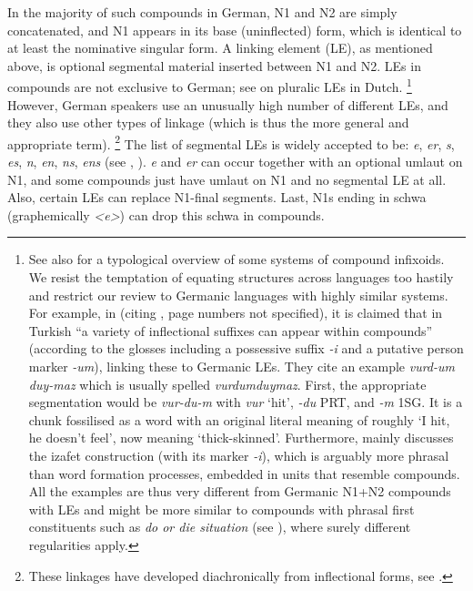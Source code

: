 In the majority of such compounds in German, N1 and N2 are simply concatenated, and N1 appears in its base (uninflected) form, which is identical to at least the nominative singular form.
A linking element (LE), as mentioned above, is optional segmental material inserted between N1 and N2.
LEs in compounds are not exclusive to German; see \textcite{SchreuderEa1998,BangaEa2013a,BangaEa2013b} on pluralic LEs in Dutch.%
\footnote{See also \textcite[27]{KrottEa2007} for a typological overview of some systems of compound infixoids.
We resist the temptation of equating structures across languages too hastily and restrict our review to Germanic languages with highly similar systems.
For example, in \textcite[4]{KirchnerNicoladis2009} (citing \citealt{Spencer1991}, page numbers not specified), it is claimed that in Turkish ``a variety of inflectional suffixes can appear within compounds'' (according to the glosses including a possessive suffix \textit{-i} and a putative person marker \mbox{\textit{-um}}), linking these to Germanic LEs.
They cite an example \textit{vurd-um duy-maz} which is usually spelled \textit{vurdumduymaz}.
First, the appropriate segmentation would be \textit{vur-du-m} with \textit{vur} `hit', \textit{-du} PRT, and \textit{-m} \textsc{1SG}.
It is a chunk fossilised as a word with an original literal meaning of roughly `I hit, he doesn't feel', now meaning `thick-skinned'.
Furthermore, \textcite[313--319]{Spencer1991} mainly discusses the izafet construction (with its marker \textit{-i}), which is arguably more phrasal than word formation processes, embedded in units that resemble compounds.
All the examples are thus very different from Germanic N1+N2 compounds with LEs and might be more similar to compounds with phrasal first constituents such as \textit{do or die situation} (see \citealt[366]{Olsen2015}), where surely different regularities apply.
}
However, German speakers use an unusually high number of different LEs, and they also use other types of linkage (which is thus the more general and appropriate term).%
\footnote{These linkages have developed diachronically from inflectional forms, see \textcite{NueblingSzczepaniak2013,Szczepaniak2016}.}
The list of segmental LEs is widely accepted to be: \textit{e}, \textit{er}, \textit{s}, \textit{es}, \textit{n}, \textit{en}, \textit{ns}, \textit{ens} (see \citealt[31]{Neef2015}, \citealt{KrottEa2007}).
\textit{e} and \textit{er} can occur together with an optional umlaut on N1, and some compounds just have umlaut on N1 and no segmental LE at all.
Also, certain LEs can replace N1-final segments.
Last, N1s ending in schwa (graphemically \textit{<e>}) can drop this schwa in compounds.


